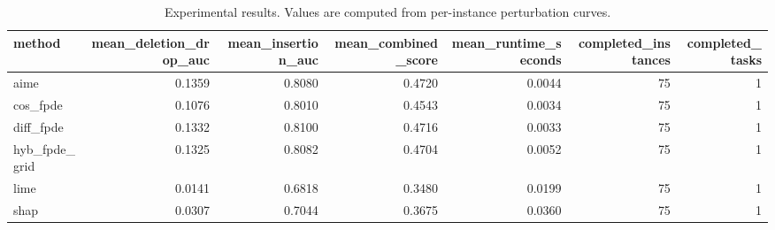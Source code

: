 \begin{table}[t]
\caption{Experimental results. Values are computed from per-instance perturbation curves.}
\label{tab:main_results_computed}
\centering
\begin{tabular}{lrrrrrr}
\toprule
method & mean\_deletion\_drop\_auc & mean\_insertion\_auc & mean\_combined\_score & mean\_runtime\_seconds & completed\_instances & completed\_tasks \\
\midrule
aime & 0.1359 & 0.8080 & 0.4720 & 0.0044 & 75 & 1 \\
cos\_fpde & 0.1076 & 0.8010 & 0.4543 & 0.0034 & 75 & 1 \\
diff\_fpde & 0.1332 & 0.8100 & 0.4716 & 0.0033 & 75 & 1 \\
hyb\_fpde\_grid & 0.1325 & 0.8082 & 0.4704 & 0.0052 & 75 & 1 \\
lime & 0.0141 & 0.6818 & 0.3480 & 0.0199 & 75 & 1 \\
shap & 0.0307 & 0.7044 & 0.3675 & 0.0360 & 75 & 1 \\
\bottomrule
\end{tabular}

\end{table}
